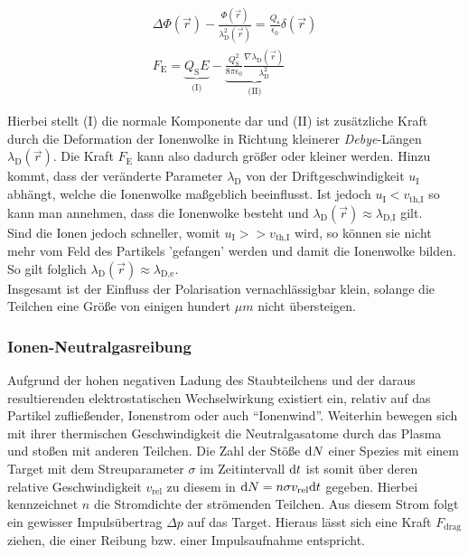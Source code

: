 \documentclass[numbers=noenddot,a4paper]{scrartcl}
\newcommand{\diff}{\textnormal{d}}
\newcommand{\ix}[1]{_\text{#1}}
\newcommand{\tilt}[1]{\textit{#1}}
\begin{document}
					\begin{align}
						\Delta \Phi\left(\vec{r}\right)-\frac{\Phi\left(\vec{r}\right)}{\lambda\ix{D}^2\left(\vec{r}\right)}=\frac{Q\ix{s}}{\epsilon\ix{0}}\delta\left(\vec{r}\right) \\
						F\ix{E}=\underbrace{Q\ix{S}E}_{\text{(I)}}-\underbrace{\frac{Q\ix{S}^2}{8\pi\epsilon\ix{0}}\frac{\nabla\lambda\ix{D}\left(\vec{r}\right)}{\lambda\ix{D}^2}}_{\text{(II)}}
					\end{align}
				
				Hierbei stellt (I) die normale Komponente dar und (II) ist zusätzliche Kraft durch die Deformation der Ionenwolke in Richtung kleinerer \tilt{Debye}-Längen $\lambda\ix{D}\left(\vec{r}\right)$. Die Kraft $F\ix{E}$ kann also dadurch größer oder kleiner werden. Hinzu kommt, dass der veränderte Parameter $\lambda\ix{D}$ von der Driftgeschwindigkeit $u\ix{I}$ abhängt, welche die Ionenwolke maßgeblich beeinflusst. Ist jedoch $u\ix{I}<v\ix{th,I}$ so kann man annehmen, dass die Ionenwolke besteht und $\lambda\ix{D}\left(\vec{r}\right)\approx\lambda\ix{D,I}$ gilt.\\
				Sind die Ionen jedoch schneller, womit $u\ix{I}>>v\ix{th,I}$ wird, so können sie nicht mehr vom Feld des Partikels 'gefangen' werden und damit die Ionenwolke bilden. So gilt folglich $\lambda\ix{D}\left(\vec{r}\right)\approx\lambda\ix{D,e}$.\\
				Insgesamt ist der Einfluss der Polarisation vernachlässigbar klein, solange die Teilchen eine Größe von einigen hundert $\unit{\mu m}$ nicht übersteigen.

			\subsubsection{Ionen-Neutralgasreibung}\label{subsub:reibung}

				Aufgrund der hohen negativen Ladung des Staubteilchens und der daraus resultierenden elektrostatischen Wechselwirkung existiert ein, relativ auf das Partikel zufließender, Ionenstrom oder auch "`Ionenwind"'. Weiterhin bewegen sich mit ihrer thermischen Geschwindigkeit die Neutralgasatome durch das Plasma und stoßen mit anderen Teilchen. Die Zahl der Stöße $\diff N$ einer Spezies mit einem Target mit dem Streuparameter $\sigma$ im Zeitintervall $\diff t$ ist somit über deren relative Geschwindigkeit $v\ix{rel}$ zu diesem in $\diff N=n\sigma v\ix{rel}\diff t$ gegeben. Hierbei kennzeichnet $n$ die Stromdichte der strömenden Teilchen. Aus diesem Strom folgt ein gewisser Impulsübertrag $\Delta p$ auf das Target. Hieraus lässt sich eine Kraft $F\ix{drag}$ ziehen, die einer Reibung bzw. einer Impulsaufnahme entspricht.
				
\end{document}
